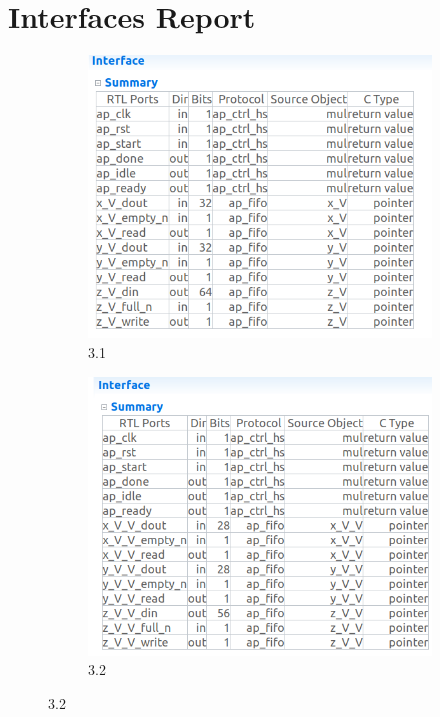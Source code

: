 \documentclass{article}
\begin{document}
\section{Interfaces Report}
\vspace{1cm}
\begin{figure}[h]
\centering
\begin{subfigure}[b]{0.6\textwidth}
    \centering
\includegraphics[width=\textwidth]{figs/33a.png}
    \caption{3.1}
    \label{fig:my_label}
\end{subfigure}
\hfill
\begin{subfigure}[b]{0.6\textwidth}
    \centering
\includegraphics[width=\textwidth]{figs/33b.png}
    \caption{3.2}
    \label{fig:my_label}
\end{subfigure}
\end{figure}
\vspace{15cm}
\end{document}
